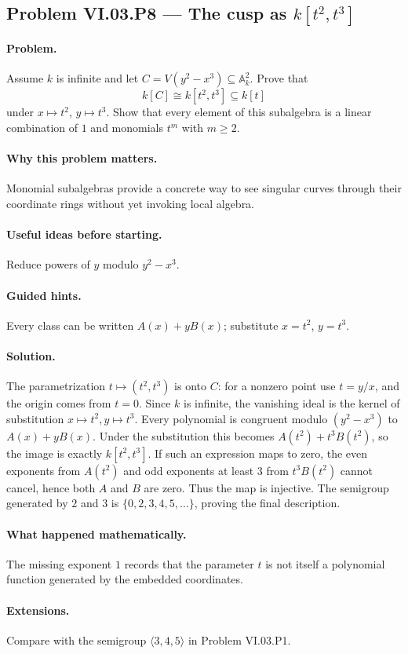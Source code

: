 \subsection*{Problem VI.03.P8 --- The cusp as \(k[t^2,t^3]\)}
\label{prob:vi03-p8}
\paragraph{Problem.}
Assume \(k\) is infinite and let \(C=V(y^2-x^3)\subseteq\mathbb A_k^2\).  Prove that
\[
k[C]\cong k[t^2,t^3]\subseteq k[t]
\]
under \(x\mapsto t^2\), \(y\mapsto t^3\).  Show that every element of this subalgebra is a
linear combination of \(1\) and monomials \(t^m\) with \(m\ge2\).
\ifdefined\FullProblemDossiers
\paragraph{Why this problem matters.} Monomial subalgebras provide a concrete way to see singular curves through their coordinate rings without yet invoking local algebra.
\paragraph{Useful ideas before starting.} Reduce powers of \(y\) modulo \(y^2-x^3\).
\paragraph{Guided hints.} Every class can be written \(A(x)+yB(x)\); substitute \(x=t^2\), \(y=t^3\).
\paragraph{Solution.}
The parametrization \(t\mapsto(t^2,t^3)\) is onto \(C\): for a nonzero point use
\(t=y/x\), and the origin comes from \(t=0\).  Since \(k\) is infinite, the vanishing ideal
is the kernel of substitution \(x\mapsto t^2,y\mapsto t^3\).  Every polynomial is congruent modulo \((y^2-x^3)\) to \(A(x)+yB(x)\).  Under the
substitution this becomes \(A(t^2)+t^3B(t^2)\), so the image is exactly
\(k[t^2,t^3]\).  If such an expression maps to zero, the even exponents from \(A(t^2)\)
and odd exponents at least \(3\) from \(t^3B(t^2)\) cannot cancel, hence both \(A\) and
\(B\) are zero.  Thus the map is injective.  The semigroup generated by \(2\) and \(3\) is
\(\{0,2,3,4,5,\dots\}\), proving the final description.
\paragraph{What happened mathematically.} The missing exponent \(1\) records that the parameter \(t\) is not itself a polynomial function generated by the embedded coordinates.
\paragraph{Extensions.} Compare with the semigroup \(\langle3,4,5\rangle\) in Problem VI.03.P1.
\fi
